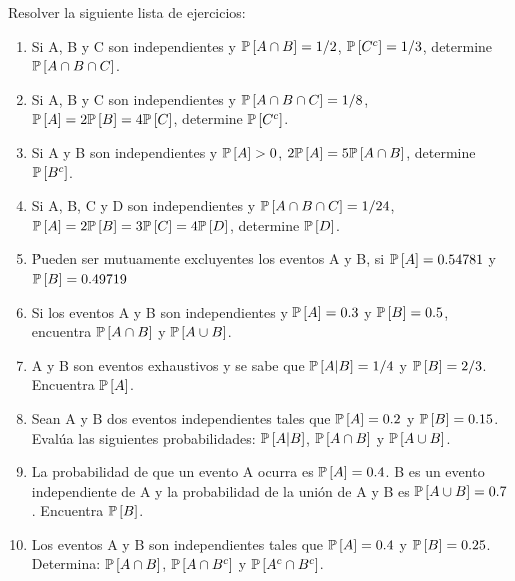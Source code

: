 \begin{Ejer} Resolver la siguiente lista de ejercicios:
\begin{enumerate}
\item Si A, B y C son independientes y $\mathbb{P}\left[A\cap B\right]=1/2$, $\mathbb{P}\left[C^{c}\right]=1/3$, determine $\mathbb{P}\left[A\cap B\cap C\right]$.

\item Si A, B y C son independientes y $\mathbb{P}\left[A\cap B\cap C\right]=1/8$, $\mathbb{P}\left[A\right]=2\mathbb{P}\left[B\right]=4\mathbb{P}\left[C\right]$, determine $\mathbb{P}\left[C^{c}\right]$.

\item Si A y B son independientes y $\mathbb{P}\left[A\right]>0$, $2\mathbb{P}\left[A\right]=5\mathbb{P}\left[A\cap B\right]$, determine $\mathbb{P}\left[B^{c}\right]$.

\item Si A, B, C y D son independientes y $\mathbb{P}\left[A\cap B\cap C\right]=1/24$, $\mathbb{P}\left[A\right]=2\mathbb{P}\left[B\right]=3\mathbb{P}\left[C\right]=4\mathbb{P}\left[D\right]$, determine $\mathbb{P}\left[D\right]$.

\item \'Pueden ser mutuamente excluyentes los eventos A y B, si $\mathbb{P}\left[A\right]=0.54781$ y $\mathbb{P}\left[B\right]=0.49719$

\item Si los eventos A y B son independientes y $\mathbb{P}\left[A\right]=0.3$ y $\mathbb{P}\left[B\right]=0.5$, encuentra $\mathbb{P}\left[A\cap B\right]$ y $\mathbb{P}\left[A\cup B\right]$.

\item A y B son eventos exhaustivos y se sabe que $\mathbb{P}\left[A|B\right]=1/4$ y $\mathbb{P}\left[B\right]=2/3$. Encuentra $\mathbb{P}\left[A\right]$.

\item Sean A y B dos eventos independientes tales que $\mathbb{P}\left[A\right]=0.2$ y $\mathbb{P}\left[B\right]=0.15$. Eval\'ua las siguientes probabilidades: $\mathbb{P}\left[A|B\right]$, $\mathbb{P}\left[A\cap B\right]$ y $\mathbb{P}\left[A\cup B\right]$.

\item La probabilidad de que un evento A ocurra es $\mathbb{P}\left[A\right]=0.4$. B es un evento independiente de A y la probabilidad de la uni\'on de A y B es $\mathbb{P}\left[A\cup B\right]=0.7$. Encuentra $\mathbb{P}\left[B\right]$.

\item Los eventos A y B son independientes tales que $\mathbb{P}\left[A\right]=0.4$ y $\mathbb{P}\left[B\right]=0.25$. Determina: $\mathbb{P}\left[A\cap B\right]$, $\mathbb{P}\left[A\cap B^{c}\right]$ y $\mathbb{P}\left[A^{c}\cap B^{c}\right]$.

\end{enumerate}
\end{Ejer}

